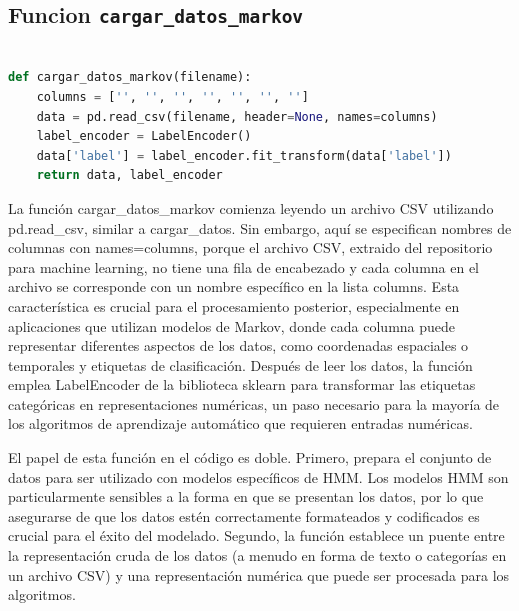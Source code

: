 \documentclass[12pt]{article}
\begin{document}
\vspace{1cm}

\subsection*{Funcion \texttt{cargar\_datos\_markov}}
\vspace{1cm}

\begin{lstlisting}[language=Python]

def cargar_datos_markov(filename):
	columns = ['', '', '', '', '', '', '']
	data = pd.read_csv(filename, header=None, names=columns)
	label_encoder = LabelEncoder()
	data['label'] = label_encoder.fit_transform(data['label'])
	return data, label_encoder

\end{lstlisting}
\vspace{1cm}

La función cargar\_datos\_markov comienza leyendo un archivo CSV utilizando pd.read\_csv, similar a cargar\_datos. Sin embargo, aquí se especifican nombres de columnas con names=columns, porque el archivo CSV, extraido del repositorio para machine learning, no tiene una fila de encabezado y cada columna en el archivo se corresponde con un nombre específico en la lista columns. Esta característica es crucial para el procesamiento posterior, especialmente en aplicaciones que utilizan modelos de Markov, donde cada columna puede representar diferentes aspectos de los datos, como coordenadas espaciales o temporales y etiquetas de clasificación. Después de leer los datos, la función emplea LabelEncoder de la biblioteca sklearn para transformar las etiquetas categóricas en representaciones numéricas, un paso necesario para la mayoría de los algoritmos de aprendizaje automático que requieren entradas numéricas.\vspace{1cm}

El papel de esta función en el código es doble. Primero, prepara el conjunto de datos para ser utilizado con modelos específicos de HMM. Los modelos HMM son particularmente sensibles a la forma en que se presentan los datos, por lo que asegurarse de que los datos estén correctamente formateados y codificados es crucial para el éxito del modelado. Segundo, la función establece un puente entre la representación cruda de los datos (a menudo en forma de texto o categorías en un archivo CSV) y una representación numérica que puede ser procesada para los algoritmos.

\vspace{1cm}
\end{document}

